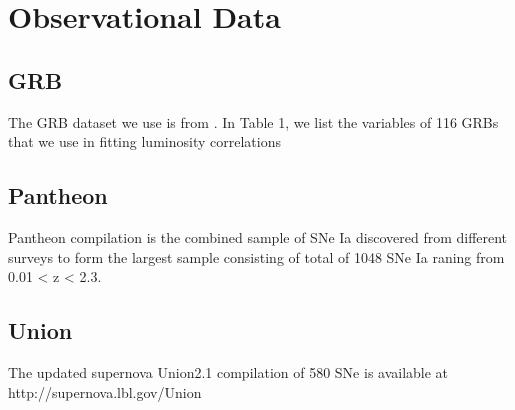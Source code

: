 \section{Observational Data}
\subsection{GRB}
The GRB dataset we use is from \cite{wang2011updated}. In Table 1, we list the variables of 116 GRBs that we use in fitting luminosity correlations
\subsection{Pantheon}
Pantheon compilation \cite{scolnic2018complete} is the combined sample of SNe Ia discovered from different surveys to form the largest sample consisting of total of 1048 SNe Ia raning from 0.01 < z < 2.3.
\subsection{Union}
The updated supernova Union2.1\cite{suzuki2012hubble} compilation of 580 SNe is available at http://supernova.lbl.gov/Union
